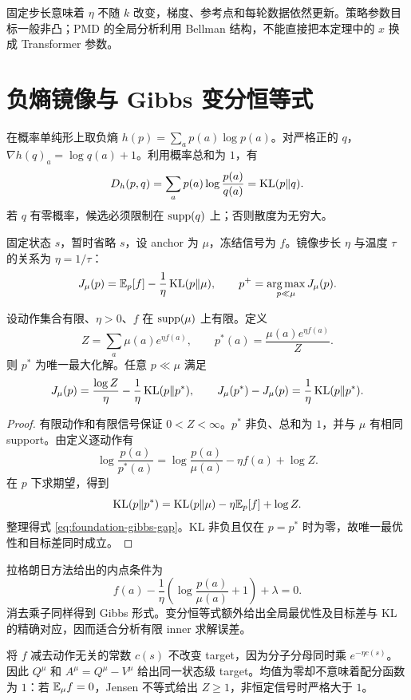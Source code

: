 固定步长意味着 $\eta$ 不随 $k$ 改变，梯度、参考点和每轮数据依然更新。策略参数目标一般非凸；PMD 的全局分析利用 Bellman 结构，不能直接把本定理中的 $x$ 换成 Transformer 参数。

\section{负熵镜像与 Gibbs 变分恒等式}

在概率单纯形上取负熵 $h(p)=\sum_ap(a)\log p(a)$。对严格正的 $q$，$\nabla h(q)_a=\log q(a)+1$。利用概率总和为 $1$，有
\[
 D_h(p,q)=\sum_ap(a)\log\frac{p(a)}{q(a)}=\operatorname{KL}(p\Vert q).
\]
若 $q$ 有零概率，候选必须限制在 $\operatorname{supp}(q)$ 上；否则散度为无穷大。

固定状态 $s$，暂时省略 $s$，设 anchor 为 $\mu$，冻结信号为 $f$。镜像步长 $\eta$ 与温度 $\tau$ 的关系为 $\eta=1/\tau$：
\begin{equation}
 J_\mu(p)=\mathbb{E}_p[f]-\frac1\eta\operatorname{KL}(p\Vert\mu),\qquad
 p^+=\operatorname*{arg\,max}_{p\ll\mu}J_\mu(p).
 \label{eq:foundation-gibbs-objective}
\end{equation}

\begin{theorem}
\label{thm:foundation-gibbs}
设动作集合有限、$\eta>0$、$f$ 在 $\operatorname{supp}(\mu)$ 上有限。定义
\[
 Z=\sum_a\mu(a)e^{\eta f(a)},\qquad
 p^*(a)=\frac{\mu(a)e^{\eta f(a)}}Z.
\]
则 $p^*$ 为唯一最大化解。任意 $p\ll\mu$ 满足
\begin{equation}
 J_\mu(p)=\frac{\log Z}\eta-\frac1\eta\operatorname{KL}(p\Vert p^*),
 \qquad J_\mu(p^*)-J_\mu(p)=\frac1\eta\operatorname{KL}(p\Vert p^*).
 \label{eq:foundation-gibbs-gap}
\end{equation}
\end{theorem}
\begin{proof}
有限动作和有限信号保证 $0<Z<\infty$。$p^*$ 非负、总和为 $1$，并与 $\mu$ 有相同 support。由定义逐动作有
\[
 \log\frac{p(a)}{p^*(a)}
 =\log\frac{p(a)}{\mu(a)}-\eta f(a)+\log Z.
\]
在 $p$ 下求期望，得到
\[
 \operatorname{KL}(p\Vert p^*)=\operatorname{KL}(p\Vert\mu)-\eta\mathbb{E}_p[f]+\log Z.
\]
整理得式 \eqref{eq:foundation-gibbs-gap}。KL 非负且仅在 $p=p^*$ 时为零，故唯一最优性和目标差同时成立。
\end{proof}

拉格朗日方法给出的内点条件为
\[
 f(a)-\frac1\eta\left(\log\frac{p(a)}{\mu(a)}+1\right)+\lambda=0.
\]
消去乘子同样得到 Gibbs 形式。变分恒等式额外给出全局最优性及目标差与 KL 的精确对应，因而适合分析有限 inner 求解误差。

将 $f$ 减去动作无关的常数 $c(s)$ 不改变 target，因为分子分母同时乘 $e^{-\eta c(s)}$。因此 $Q^\mu$ 和 $A^\mu=Q^\mu-V^\mu$ 给出同一状态级 target。均值为零却不意味着配分函数为 $1$：若 $\mathbb{E}_\mu f=0$，Jensen 不等式给出 $Z\geq1$，非恒定信号时严格大于 $1$。

